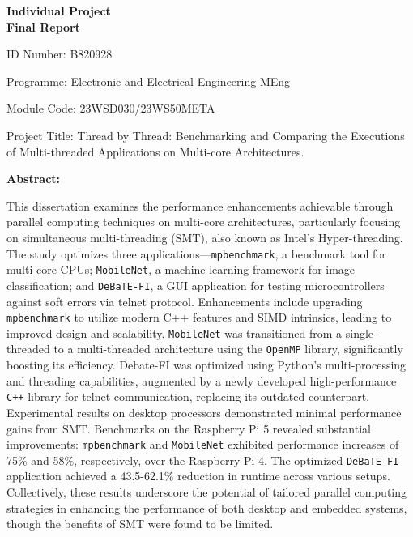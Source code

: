 \documentclass[12pt, openany]{book}
\begin{document}
\begin{titlepage}
	\centering
	\vspace*{1cm} %
	{\Huge\bfseries Individual Project\\[0.5cm] Final Report\par}
	\vspace{2cm}
	\raggedright
	ID Number: B820928\par
	
	Programme: Electronic and Electrical Engineering MEng\par
	
	Module Code: 23WSD030/23WS50META\par
	
	Project Title: Thread by Thread: Benchmarking and Comparing the Executions of Multi-threaded Applications on Multi-core Architectures.\par
	
	\textbf{Abstract:}\par %
	This dissertation examines the performance enhancements achievable through parallel computing techniques on multi-core architectures, particularly focusing on simultaneous multi-threading (SMT), also known as Intel’s Hyper-threading. The study optimizes three applications—\texttt{mpbenchmark}, a benchmark tool for multi-core CPUs; \texttt{MobileNet}, a machine learning framework for image classification; and \texttt{DeBaTE-FI}, a GUI application for testing microcontrollers against soft errors via telnet protocol. Enhancements include upgrading \texttt{mpbenchmark} to utilize modern C++ features and SIMD intrinsics, leading to improved design and scalability. \texttt{MobileNet} was transitioned from a single-threaded to a multi-threaded architecture using the \texttt{OpenMP} library, significantly boosting its efficiency. Debate-FI was optimized using Python’s multi-processing and threading capabilities, augmented by a newly developed high-performance \texttt{C++} library for telnet communication, replacing its outdated counterpart. Experimental results on desktop processors demonstrated minimal performance gains from SMT. Benchmarks on the Raspberry Pi 5 revealed substantial improvements: \texttt{mpbenchmark} and \texttt{MobileNet} exhibited performance increases of 75\% and 58\%, respectively, over the Raspberry Pi 4. The optimized \texttt{DeBaTE-FI} application achieved a 43.5-62.1\% reduction in runtime across various setups. Collectively, these results underscore the potential of tailored parallel computing strategies in enhancing the performance of both desktop and embedded systems, though the benefits of SMT were found to be limited. 
	
\end{titlepage}
\end{document}
